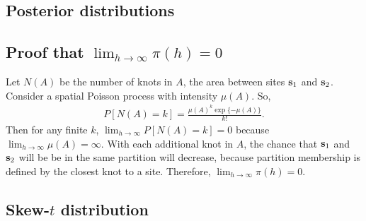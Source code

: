 \documentclass[11pt]{article}
\begin{document}
\subsection{Posterior distributions} \label{a:posterior}





\subsection{Proof that $\lim_{h \rightarrow \infty} \pi(h) = 0$} \label{a:proofsamepartition}
Let $N(A)$ be the number of knots in $A$, the area between sites $\mbox{\bf s}_1$ and $\mbox{\bf s}_2$.
Consider a spatial Poisson process with intensity $\mu(A)$.
So,
\begin{align*}
  P[ N(A) = k] = \frac{ \mu(A)^k \exp\{ -\mu(A)\}}{k!}.
\end{align*}
Then for any finite $k$, $\lim_{h \rightarrow \infty} P[N(A) = k] = 0$ because $\lim_{h \rightarrow \infty} \mu(A) = \infty$.
With each additional knot in $A$, the chance that $\mbox{\bf s}_1$ and $\mbox{\bf s}_2$ will be be in the same partition will decrease, because partition membership is defined by the closest knot to a site.
Therefore, $\lim_{h \rightarrow \infty} \pi(h) = 0$.


\subsection{Skew-$t$ distribution} \label{a:skewt}
\end{document}
